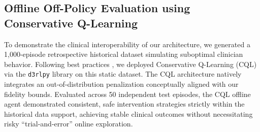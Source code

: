 \subsection{Offline Off-Policy Evaluation using Conservative Q-Learning}
To demonstrate the clinical interoperability of our architecture, we generated a 1,000-episode retrospective historical dataset simulating suboptimal clinician behavior. Following best practices \cite{levine2020offline, kumar2020cql}, we deployed Conservative Q-Learning (CQL) via the \texttt{d3rlpy} library on this static dataset. The CQL architecture natively integrates an out-of-distribution penalization conceptually aligned with our fidelity bounds. Evaluated across 50 independent test episodes, the CQL offline agent demonstrated consistent, safe intervention strategies strictly within the historical data support, achieving stable clinical outcomes without necessitating risky ``trial-and-error'' online exploration.
